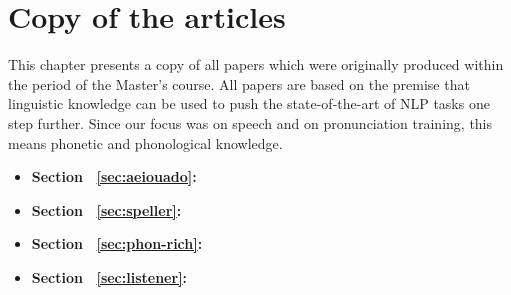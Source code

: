 \chapter{Copy of the articles}\label{ch:articles}

This chapter presents a copy of all papers which were originally produced within the period of the Master's course. All papers are based on the premise that linguistic knowledge can be used to push the state-of-the-art of NLP tasks one step further. Since our focus was on speech and on pronunciation training, this means phonetic and phonological knowledge.


\begin{itemize}
\item \textbf{Section ~\ref{sec:aeiouado}:} 
\item \textbf{Section ~\ref{sec:speller}:} 
\item \textbf{Section ~\ref{sec:phon-rich}:} 
\item \textbf{Section ~\ref{sec:listener}:} 
\end{itemize}


\cleardoublepage

\label{sec:aeiouado}
%
\cleardoublepage

\label{sec:speller}
%

\label{sec:phon-rich}
%
\cleardoublepage

\label{sec:listener}
%

